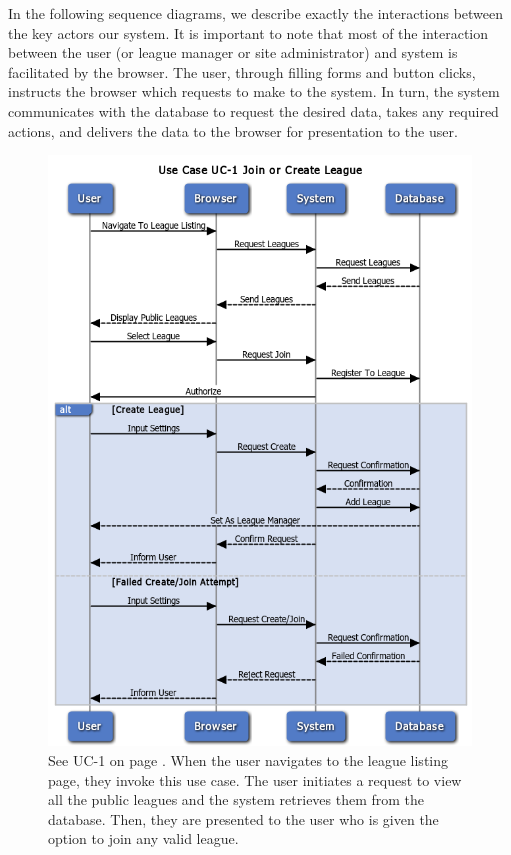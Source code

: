 In the following sequence diagrams, we describe exactly the interactions between the key actors our system. It is important to note that most of the interaction between the user (or league manager or site administrator) and system is facilitated by the browser. The user, through filling forms and button clicks, instructs the browser which requests to make to the system. In turn, the system communicates with the database to request the desired data, takes any required actions, and delivers the data to the browser for presentation to the user.

\begin{figure}
\centering
\includegraphics[width=5.5in]{./Diagrams/SystemSequenceDiagrams/uc1.png}
\caption{See UC-1 on page \pageref{UC-1}. When the user navigates to the league listing page, they invoke this use case. The user initiates a request to view all the public leagues and the system retrieves them from the database. Then, they are presented to the user who is given the option to join any valid league.}
\end{figure}


